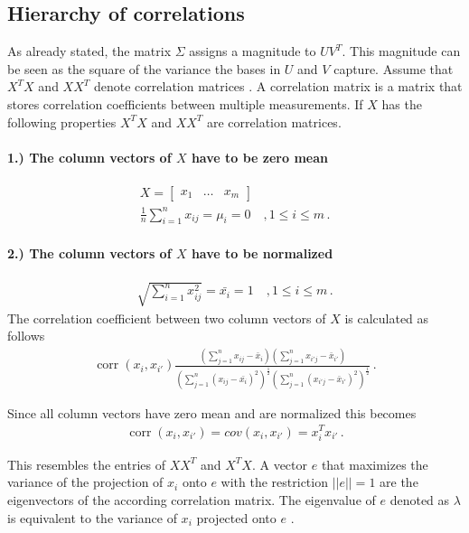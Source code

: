 \subsection{Hierarchy of correlations}
As already stated, the matrix \(\Sigma\) assigns a magnitude to \(UV^{T}\).
This magnitude can be seen as the square of the variance the bases in \(U\) and \(V\) capture.
Assume that \(X^{T}X\) and \(XX^{T}\) denote correlation matrices
\cite{brunton_kutz_2019b}.
A correlation matrix is a matrix that stores correlation coefficients between multiple measurements. 
If \(X\) has the following properties \(X^{T}X\) and \(XX^{T}\) are correlation matrices.
\paragraph{1.) The column vectors of \(X\) have to be zero mean}
\begin{gather}
X = \begin{bmatrix}
x_1 & \hdots & x_m
\end{bmatrix} \\
\frac{1}{n}\sum_{i = 1}^{n} x_{ij} = \mu_{i} = 0 \quad , 1 \leq i \leq m \,.
\end{gather}
\paragraph{2.) The column vectors of \(X\) have to be normalized}
\begin{gather}
\sqrt{\sum_{i = 1}^{n} x_{ij}^{2}} = \bar{x_i} = 1 \quad , 1 \leq i \leq m \,.
\end{gather}
The correlation coefficient between two column vectors of \(X\) is calculated as follows \cite{Suga}
\begin{gather}
\operatorname{corr}(x_i, x_{i'})\frac{(\sum_{j = 1}^{n} x_{ij} - \bar{x}_i)(\sum_{j = 1}^{n} x_{i'j} - \bar{x}_{i'})}{(\sum_{j = 1}^{n} (x_{ij}- \bar{x_{i}})^{2})^{\frac{1}{2}}(\sum_{j = 1}^{n} (x_{i'j}-  \bar{x}_{i'})^{2})^{\frac{1}{2}}} \,.
\end{gather}



Since all column vectors have zero mean and are normalized this becomes \cite{harv}
\begin{gather}
\operatorname{corr}(x_i, x_{i'}) = cov(x_i, x_{i'})= x_i^{T}x_{i'} \,.
\end{gather}

This resembles the entries of \(XX^{T}\) and \(X^{T}X\).
A vector \(e\) that maximizes the variance of the projection of \(x_i\) onto \(e\)  with the restriction \(||e|| = 1\) are the eigenvectors of the according correlation matrix.
The eigenvalue of \(e\) denoted as \(\lambda\) is equivalent to the variance of \(x_i\) projected onto \(e\) \cite{Lavrenko}.

